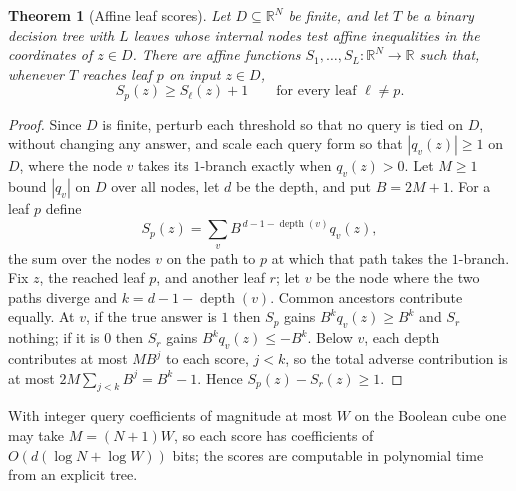 \documentclass[11pt]{article}
\newtheorem{theorem}{Theorem}[section]
\theoremstyle{definition}
\newcommand{\R}{\mathbb R}
\begin{document}
\begin{theorem}[Affine leaf scores]\label{thm:affine_scores}
Let \(D\subseteq\R^N\) be finite, and let \(T\) be a binary decision tree with \(L\) leaves whose internal nodes test affine inequalities in the coordinates of \(z\in D\). There are affine functions \(S_1,\ldots,S_L:\R^N\to\R\) such that, whenever \(T\) reaches leaf \(p\) on input \(z\in D\),
\[
 S_p(z)\ge S_\ell(z)+1\qquad\text{for every leaf }\ell\ne p.
\]
\end{theorem}
\begin{proof}
Since \(D\) is finite, perturb each threshold so that no query is tied on \(D\), without changing any answer, and scale each query form so that \(|q_v(z)|\ge1\) on \(D\), where the node \(v\) takes its \(1\)-branch exactly when \(q_v(z)>0\). Let \(M\ge1\) bound \(|q_v|\) on \(D\) over all nodes, let \(d\) be the depth, and put \(B=2M+1\). For a leaf \(p\) define
\[
 S_p(z)=\sum_{v}B^{\,d-1-\operatorname{depth}(v)}q_v(z),
\]
the sum over the nodes \(v\) on the path to \(p\) at which that path takes the \(1\)-branch. Fix \(z\), the reached leaf \(p\), and another leaf \(r\); let \(v\) be the node where the two paths diverge and \(k=d-1-\operatorname{depth}(v)\). Common ancestors contribute equally. At \(v\), if the true answer is \(1\) then \(S_p\) gains \(B^kq_v(z)\ge B^k\) and \(S_r\) nothing; if it is \(0\) then \(S_r\) gains \(B^kq_v(z)\le-B^k\). Below \(v\), each depth contributes at most \(MB^j\) to each score, \(j<k\), so the total adverse contribution is at most \(2M\sum_{j<k}B^j=B^k-1\). Hence \(S_p(z)-S_r(z)\ge1\).
\end{proof}

With integer query coefficients of magnitude at most \(W\) on the Boolean cube one may take \(M=(N+1)W\), so each score has coefficients of \(O(d(\log N+\log W))\) bits; the scores are computable in polynomial time from an explicit tree.
\end{document}
